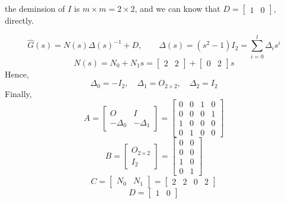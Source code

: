 \documentclass[12pt,a4paper]{article}
\begin{document}
the deminsion of $I$ is $m \times m = 2 \times 2$, and we can know that $D = \begin{bmatrix}
	1 & 0
\end{bmatrix}$, directly.

\[
\hat G(s) = N(s)\Delta(s)^{-1}+D,\qquad
\Delta(s)=(s^2-1)I_2=\sum_{i=0}^{l}\Delta_i s^i
\]
\[
N(s) = N_0 + N_1s = \begin{bmatrix}
	2 & 2
\end{bmatrix} + \begin{bmatrix}
0 & 2
\end{bmatrix}s
\]
Hence, 
\[
\Delta_0=-I_2,\quad \Delta_1=O_{2\times2},\quad \Delta_2=I_2
\]
Finally, 
\[
A = \begin{bmatrix}
	O & I \\
	-\Delta_0 & -\Delta_1
\end{bmatrix} = \begin{bmatrix}
	0 & 0 & 1 & 0 \\
	0 & 0 & 0 & 1 \\
	1 & 0 & 0 & 0 \\
	0 & 1 & 0 & 0
\end{bmatrix}
\]
\[
B = \begin{bmatrix}
	O_{2\times2} \\ I_2
\end{bmatrix} = \begin{bmatrix}
	0 & 0 \\
	0 & 0 \\
	1 & 0 \\
	0 & 1
\end{bmatrix}
\]
\[
C = \begin{bmatrix}
	N_0 & N_1
\end{bmatrix} = \begin{bmatrix}
2 & 2 & 0 & 2
\end{bmatrix}
\]
\[
D = \begin{bmatrix}
	1 & 0
\end{bmatrix}
\]
\end{document}
